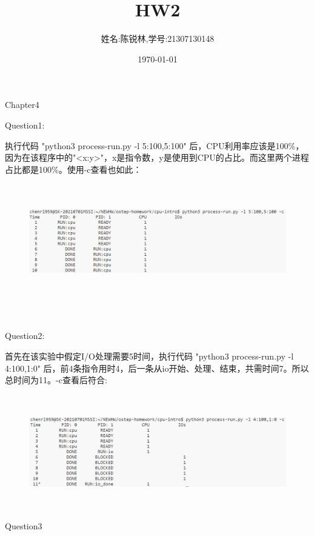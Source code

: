 \documentclass[12pt]{article}
\title{HW2}
\author{姓名:陈锐林,学号:21307130148}
\date{\today}
\begin{document}
\maketitle
\begin{LARGE}
    \noindent Chapter4\\
\end{LARGE}
\begin{large}
    Question1:\\
\end{large}
\hspace*{2em}执行代码 "python3 process-run.py -l 5:100,5:100" 后，CPU利用率应该是100\%，因为在该程序中的"<x:y>"，x是指令数，y是使用到CPU的占比。而这里两个进程占比都是100\%。使用-c查看也如此：
\begin{figure}[h]
    \centering
    \includegraphics*[height=5cm,width=13cm]{HW2-1.jpg}
\end{figure}\\
\begin{large}
    Question2:\\
\end{large}
\hspace*{2em}首先在该实验中假定I/O处理需要5时间，执行代码 "python3 process-run.py -l 4:100,1:0" 后，前4条指令用时4，后一条从io开始、处理、结束，共需时间7。所以总时间为11。-c查看后符合:
\begin{figure}[h]
    \centering
    \includegraphics[height=5cm,width=13cm]{HW2-2.jpg}
\end{figure}
\newpage
\begin{large}
    \noindent Question3\\
\end{large}
\end{document}
